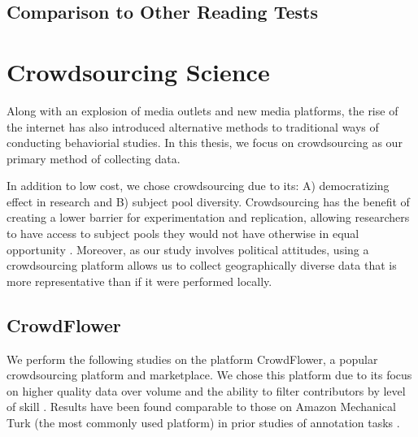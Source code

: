 \subsection{Comparison to Other Reading Tests}

\section{Crowdsourcing Science}

Along with an explosion of media outlets and new media platforms, the rise of the internet has also introduced alternative methods to traditional ways of conducting behaviorial studies. In this thesis, we focus on crowdsourcing as our primary method of collecting data.

In addition to low cost, we chose crowdsourcing due to its: A) democratizing effect in research and B) subject pool diversity. Crowdsourcing has the benefit of creating a lower barrier for experimentation and replication, allowing researchers to have access to subject pools they would not have otherwise in equal opportunity 
\cite{mason2012conducting}. Moreover, as our study involves political attitudes, using a crowdsourcing platform allows us to collect geographically diverse data that is more representative than if it were performed locally.   

 
\subsection{CrowdFlower}

We perform the following studies on the platform CrowdFlower, a popular crowdsourcing platform and marketplace. We chose this platform due to its focus on higher quality data over volume and the ability to filter contributors by level of skill \cite{CrowdFlower-levels}. Results have been found comparable to those on Amazon Mechanical Turk (the most commonly used platform) in prior studies of annotation tasks \cite{finin2010annotating}.
